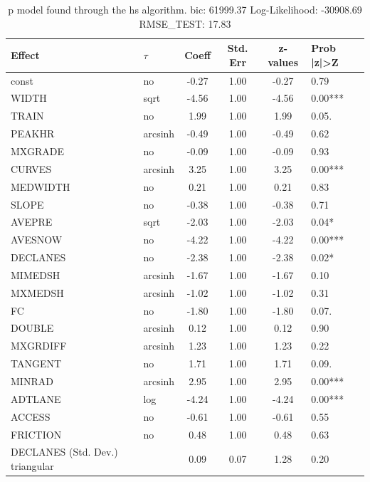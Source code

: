 \begin{table}
	\caption{p model found through the hs algorithm. bic: 61999.37 Log-Likelihood: -30908.69 RMSE_TEST: 17.83}
	\begin{center}
		\begin{tabular}{|l|l|c|c|c|l|}
			\hline
			Effect & $\tau$ & Coeff & Std. Err & z-values & Prob |z|>Z \\
			\hline
			const & no & -0.27 & 1.00 & -0.27 & 0.79 \\
			\hline
			WIDTH & sqrt & -4.56 & 1.00 & -4.56 & 0.00*** \\
			\hline
			TRAIN & no & 1.99 & 1.00 & 1.99 & 0.05. \\
			\hline
			PEAKHR & arcsinh & -0.49 & 1.00 & -0.49 & 0.62 \\
			\hline
			MXGRADE & no & -0.09 & 1.00 & -0.09 & 0.93 \\
			\hline
			CURVES & arcsinh & 3.25 & 1.00 & 3.25 & 0.00*** \\
			\hline
			MEDWIDTH & no & 0.21 & 1.00 & 0.21 & 0.83 \\
			\hline
			SLOPE & no & -0.38 & 1.00 & -0.38 & 0.71 \\
			\hline
			AVEPRE & sqrt & -2.03 & 1.00 & -2.03 & 0.04* \\
			\hline
			AVESNOW & no & -4.22 & 1.00 & -4.22 & 0.00*** \\
			\hline
			DECLANES & no & -2.38 & 1.00 & -2.38 & 0.02* \\
			\hline
			MIMEDSH & arcsinh & -1.67 & 1.00 & -1.67 & 0.10 \\
			\hline
			MXMEDSH & arcsinh & -1.02 & 1.00 & -1.02 & 0.31 \\
			\hline
			FC & no & -1.80 & 1.00 & -1.80 & 0.07. \\
			\hline
			DOUBLE & arcsinh & 0.12 & 1.00 & 0.12 & 0.90 \\
			\hline
			MXGRDIFF & arcsinh & 1.23 & 1.00 & 1.23 & 0.22 \\
			\hline
			TANGENT & no & 1.71 & 1.00 & 1.71 & 0.09. \\
			\hline
			MINRAD & arcsinh & 2.95 & 1.00 & 2.95 & 0.00*** \\
			\hline
			ADTLANE & log & -4.24 & 1.00 & -4.24 & 0.00*** \\
			\hline
			ACCESS & no & -0.61 & 1.00 & -0.61 & 0.55 \\
			\hline
			FRICTION & no & 0.48 & 1.00 & 0.48 & 0.63 \\
			\hline
			DECLANES (Std. Dev.) triangular &  & 0.09 & 0.07 & 1.28 & 0.20 \\

\end{tabular}
\end{center}
\end{table}
